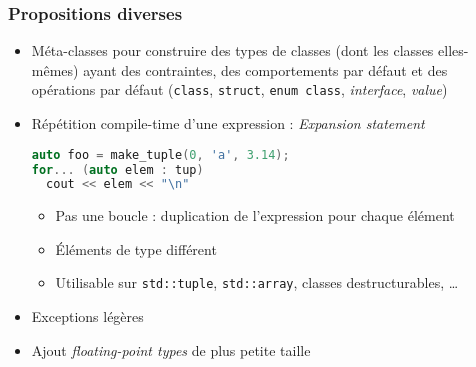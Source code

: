\documentclass[C++.tex]{subfiles}
\begin{document}
\begin{frame}[fragile]
	\frametitle{Propositions diverses}
	\begin{itemize}
		\item Méta-classes pour construire des types de classes (dont les classes elles-mêmes) ayant des contraintes, des comportements par défaut et des opérations par défaut (\lstinline|class|, \lstinline|struct|, \lstinline|enum class|, \textit{interface}, \textit{value})
		\item Répétition compile-time d'une expression : \textit{Expansion statement}
		
			\begin{lstlisting}[language=C++]
auto foo = make_tuple(0, 'a', 3.14);
for... (auto elem : tup)  
  cout << elem << "\n"\end{lstlisting}
			
			\begin{itemize}
				\item Pas une boucle : duplication de l'expression pour chaque élément
				\item Éléments de type différent
				\item Utilisable sur \lstinline|std::tuple|, \lstinline|std::array|, classes destructurables, \ldots
			\end{itemize}
		\item Exceptions légères


		\item Ajout \textit{floating-point types} de plus petite taille
	\end{itemize}
\end{frame}
\end{document}
